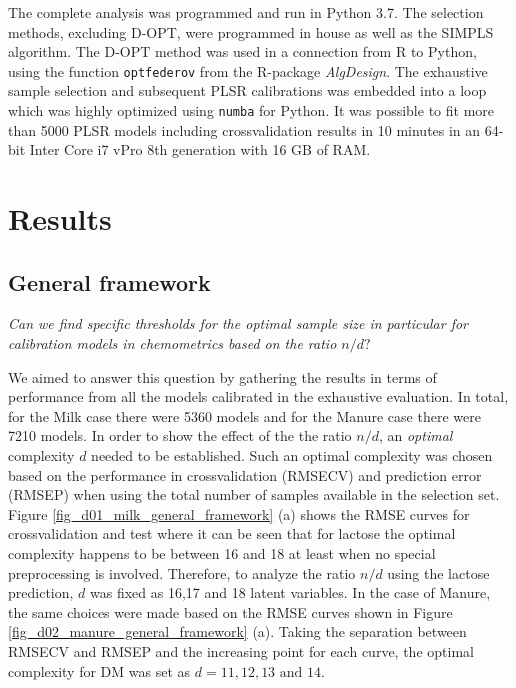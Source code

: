 \documentclass[journal=ancham,manuscript=article]{achemso}
\begin{document}
The complete analysis was programmed and run in Python 3.7. The selection methods, excluding D-OPT, were programmed in house as well as the SIMPLS algorithm. The D-OPT method was used in a connection from R to Python, using the function \texttt{optfederov} from the R-package \emph{AlgDesign}. The exhaustive sample selection and subsequent PLSR calibrations was embedded into a loop which was highly optimized using \texttt{numba} for Python. It was possible to fit more than 5000 PLSR models including crossvalidation results in 10 minutes in an 64-bit Inter Core i7 vPro 8th generation with 16 GB of RAM. 



\section*{Results}\label{results}

\subsection*{General framework}\label{results:genframework}

\emph{Can  we  find  specific  thresholds  for  the  optimal  sample  size  in  particular  for  calibration  models  in chemometrics based on the ratio $n/d?$}

We aimed to answer this question by gathering the results in terms of performance from all the models calibrated in the exhaustive evaluation. In total, for the Milk case there were 5360 models and for the Manure case there were 7210 models. In order to show the effect of the the ratio $n/d$, an \emph{optimal} complexity $d$ needed to be established. Such an optimal complexity was chosen based on the performance in crossvalidation (RMSECV) and prediction error (RMSEP) when using the total number of samples available in the selection set. Figure \ref{fig_d01_milk_general_framework} (a) shows the RMSE curves for crossvalidation and test where it can be seen that for lactose the optimal complexity happens to be between 16 and 18 at least when no special preprocessing is involved. Therefore, to analyze the ratio $n/d$ using the lactose prediction, $d$ was fixed as 16,17 and 18 latent variables. In the case of Manure, the same choices were made based on the RMSE curves shown in Figure \ref{fig_d02_manure_general_framework} (a). Taking the separation between RMSECV and RMSEP and the increasing point for each curve, the optimal complexity for DM was set as $d = 11,12,13 \text{ and } 14$. 
\end{document}
